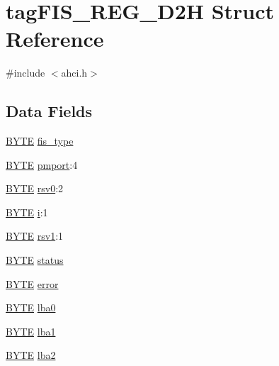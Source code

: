 \hypertarget{structtagFIS__REG__D2H}{}\section{tag\+F\+I\+S\+\_\+\+R\+E\+G\+\_\+\+D2H Struct Reference}
\label{structtagFIS__REG__D2H}


{\ttfamily \#include $<$ahci.\+h$>$}

\subsection*{Data Fields}
\begin{DoxyCompactItemize}
\item 
\hyperlink{ahci_8h_aae9749d96e15ccb4f482dd5f55d98f9b}{B\+Y\+TE} \hyperlink{structtagFIS__REG__D2H_a48b469a34dac330c43315111ce56553b}{fis\+\_\+type}
\item 
\hyperlink{ahci_8h_aae9749d96e15ccb4f482dd5f55d98f9b}{B\+Y\+TE} \hyperlink{structtagFIS__REG__D2H_a85a6466287c4f5c8e7c1a6abc0b9e4b6}{pmport}\+:4
\item 
\hyperlink{ahci_8h_aae9749d96e15ccb4f482dd5f55d98f9b}{B\+Y\+TE} \hyperlink{structtagFIS__REG__D2H_a022c6f676ebf8c905a2c69ccbc963076}{rsv0}\+:2
\item 
\hyperlink{ahci_8h_aae9749d96e15ccb4f482dd5f55d98f9b}{B\+Y\+TE} \hyperlink{structtagFIS__REG__D2H_ad1c214f4e1b1c414d06d831dd5286d93}{i}\+:1
\item 
\hyperlink{ahci_8h_aae9749d96e15ccb4f482dd5f55d98f9b}{B\+Y\+TE} \hyperlink{structtagFIS__REG__D2H_abc5cb50ec713bd93a7d4c80636652212}{rsv1}\+:1
\item 
\hyperlink{ahci_8h_aae9749d96e15ccb4f482dd5f55d98f9b}{B\+Y\+TE} \hyperlink{structtagFIS__REG__D2H_a129444d0f3e7ded98c38e3630bbcc78d}{status}
\item 
\hyperlink{ahci_8h_aae9749d96e15ccb4f482dd5f55d98f9b}{B\+Y\+TE} \hyperlink{structtagFIS__REG__D2H_afa16fb268f92ed1208a7bda6799ff34b}{error}
\item 
\hyperlink{ahci_8h_aae9749d96e15ccb4f482dd5f55d98f9b}{B\+Y\+TE} \hyperlink{structtagFIS__REG__D2H_aeebe1bc3c3173344da5039a59ee25b7a}{lba0}
\item 
\hyperlink{ahci_8h_aae9749d96e15ccb4f482dd5f55d98f9b}{B\+Y\+TE} \hyperlink{structtagFIS__REG__D2H_ad425a01c188efd5e1a76b1cb9ab0f313}{lba1}
\item 
\hyperlink{ahci_8h_aae9749d96e15ccb4f482dd5f55d98f9b}{B\+Y\+TE} \hyperlink{structtagFIS__REG__D2H_a7d3873a2285da0d638452bb907cd4cca}{lba2}

\end{DoxyCompactItemize}
